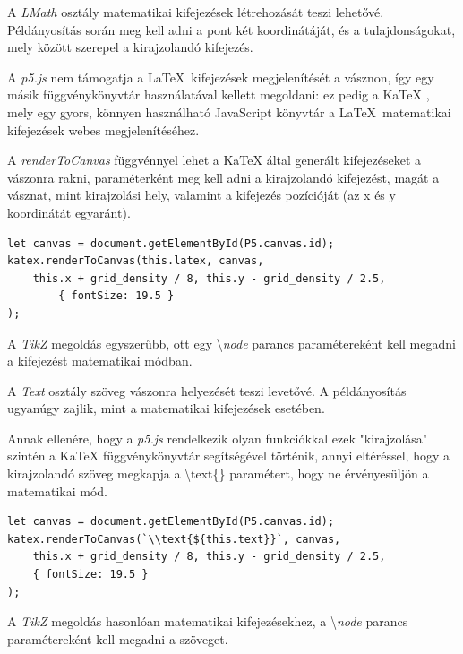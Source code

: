 
A \textit{LMath} osztály matematikai kifejezések létrehozását teszi lehetővé. Példányosítás során meg kell adni a pont két koordinátáját, és a tulajdonságokat, mely között szerepel a kirajzolandó kifejezés. 

A \textit{p5.js} nem támogatja a \LaTeX\ kifejezések megjelenítését a vásznon, így egy másik függvénykönyvtár használatával kellett megoldani: ez pedig a KaTeX \cite{katex}, mely egy gyors, könnyen használható JavaScript könyvtár a \LaTeX\ matematikai kifejezések webes megjelenítéséhez.

A \textit{renderToCanvas} függvénnyel lehet a KaTeX által generált kifejezéseket a vászonra rakni, paraméterként meg kell adni a kirajzolandó kifejezést, magát a vásznat, mint kirajzolási hely, valamint a kifejezés pozícióját (az x és y koordinátát egyaránt).

\begin{lstlisting}[style=es6, morekeywords={document, P5, katex}]
let canvas = document.getElementById(P5.canvas.id);
katex.renderToCanvas(this.latex, canvas, 
    this.x + grid_density / 8, this.y - grid_density / 2.5, 
        { fontSize: 19.5 }
);
\end{lstlisting}

A \textit{TikZ} megoldás egyszerűbb, ott egy \textbackslash \textit{node} parancs paramétereként kell megadni a kifejezést matematikai módban.


A \textit{Text} osztály szöveg vászonra helyezését teszi levetővé. A példányosítás ugyanúgy zajlik, mint a matematikai kifejezések esetében.

Annak ellenére, hogy a \textit{p5.js} rendelkezik olyan funkciókkal ezek "kirajzolása" szintén a KaTeX függvénykönyvtár segítségével történik, annyi eltéréssel, hogy a kirajzolandó szöveg megkapja a \textbackslash text\{\} paramétert, hogy ne érvényesüljön a matematikai mód.

\begin{lstlisting}[style=es6, morekeywords={document, P5, katex}]
let canvas = document.getElementById(P5.canvas.id);
katex.renderToCanvas(`\\text{${this.text}}`, canvas, 
    this.x + grid_density / 8, this.y - grid_density / 2.5,
    { fontSize: 19.5 }
);
\end{lstlisting}

A \textit{TikZ} megoldás hasonlóan matematikai kifejezésekhez, a \textbackslash \textit{node} parancs paramétereként kell megadni a szöveget.

